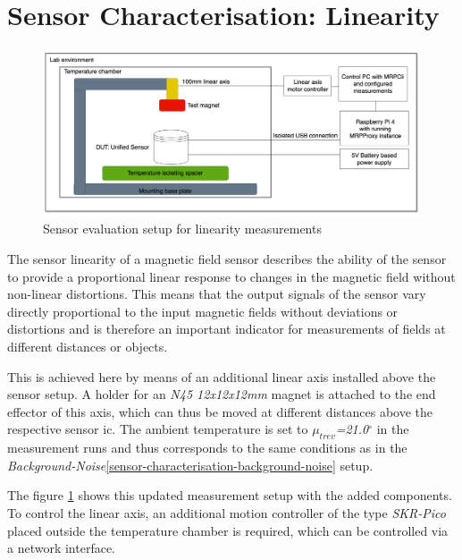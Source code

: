 \hypertarget{sensor-characterisation-linearity}{%
\section{Sensor Characterisation:
Linearity}\label{sensor-characterisation-linearity}}

\begin{figure}
\centering
\includegraphics{./generated_images/border_Sensor_evaluation_setup_for_linearity_measurements.png}
\caption{Sensor evaluation setup for linearity measurements
\label{Sensor_evaluation_setup_for_linearity_measurements.png}}
\end{figure}

The sensor linearity of a magnetic field sensor describes the ability of
the sensor to provide a proportional linear response to changes in the
magnetic field without non-linear distortions. This means that the
output signals of the sensor vary directly proportional to the input
magnetic fields without deviations or distortions and is therefore an
important indicator for measurements of fields at different distances or
objects.

This is achieved here by means of an additional linear axis installed
above the sensor setup. A holder for an \emph{N45 12x12x12mm} magnet is
attached to the end effector of this axis, which can thus be moved at
different distances above the respective sensor \gls{ic}. The ambient
temperature is set to \emph{\(\mu_{trev}\)=21.0\(^{\circ}\)} in the
measurement runs and thus corresponds to the same conditions as in the
\emph{Background-Noise}\ref{sensor-characterisation-background-noise}
setup.

The figure \ref{Sensor_evaluation_setup_for_linearity_measurements.png}
shows this updated measurement setup with the added components. To
control the linear axis, an additional motion controller of the type
\emph{SKR-Pico} placed outside the temperature chamber is required,
which can be controlled via a network interface.


